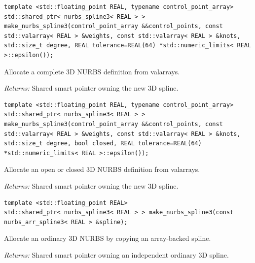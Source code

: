 \par\noindent\begin{minipage}{\linewidth}
\begin{lstlisting}[style=apireference]
template <std::floating_point REAL, typename control_point_array>
std::shared_ptr< nurbs_spline3< REAL > > make_nurbs_spline3(control_point_array &&control_points, const std::valarray< REAL > &weights, const std::valarray< REAL > &knots, std::size_t degree, REAL tolerance=REAL(64) *std::numeric_limits< REAL >::epsilon());
\end{lstlisting}
{\footnotesize Allocate a complete 3D NURBS definition from valarrays.\par}
{\footnotesize\textit{Returns:} Shared smart pointer owning the new 3D spline.\par}
\end{minipage}\par\vspace{1pt}
\par\noindent\begin{minipage}{\linewidth}
\begin{lstlisting}[style=apireference]
template <std::floating_point REAL, typename control_point_array>
std::shared_ptr< nurbs_spline3< REAL > > make_nurbs_spline3(control_point_array &&control_points, const std::valarray< REAL > &weights, const std::valarray< REAL > &knots, std::size_t degree, bool closed, REAL tolerance=REAL(64) *std::numeric_limits< REAL >::epsilon());
\end{lstlisting}
{\footnotesize Allocate an open or closed 3D NURBS definition from valarrays.\par}
{\footnotesize\textit{Returns:} Shared smart pointer owning the new 3D spline.\par}
\end{minipage}\par\vspace{1pt}
\par\noindent\begin{minipage}{\linewidth}
\begin{lstlisting}[style=apireference]
template <std::floating_point REAL>
std::shared_ptr< nurbs_spline3< REAL > > make_nurbs_spline3(const nurbs_arr_spline3< REAL > &spline);
\end{lstlisting}
{\footnotesize Allocate an ordinary 3D NURBS by copying an array-backed spline.\par}
{\footnotesize\textit{Returns:} Shared smart pointer owning an independent ordinary 3D spline.\par}
\end{minipage}\par\vspace{1pt}
